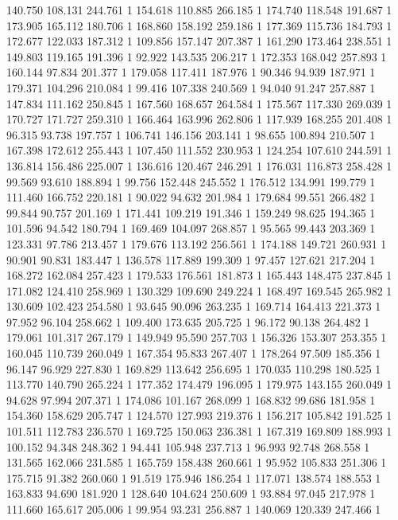 	140.750	108.131	244.761	1
	154.618	110.885	266.185	1
	174.740	118.548	191.687	1
	173.905	165.112	180.706	1
	168.860	158.192	259.186	1
	177.369	115.736	184.793	1
	172.677	122.033	187.312	1
	109.856	157.147	207.387	1
	161.290	173.464	238.551	1
	149.803	119.165	191.396	1
	92.922	143.535	206.217	1
	172.353	168.042	257.893	1
	160.144	97.834	201.377	1
	179.058	117.411	187.976	1
	90.346	94.939	187.971	1
	179.371	104.296	210.084	1
	99.416	107.338	240.569	1
	94.040	91.247	257.887	1
	147.834	111.162	250.845	1
	167.560	168.657	264.584	1
	175.567	117.330	269.039	1
	170.727	171.727	259.310	1
	166.464	163.996	262.806	1
	117.939	168.255	201.408	1
	96.315	93.738	197.757	1
	106.741	146.156	203.141	1
	98.655	100.894	210.507	1
	167.398	172.612	255.443	1
	107.450	111.552	230.953	1
	124.254	107.610	244.591	1
	136.814	156.486	225.007	1
	136.616	120.467	246.291	1
	176.031	116.873	258.428	1
	99.569	93.610	188.894	1
	99.756	152.448	245.552	1
	176.512	134.991	199.779	1
	111.460	166.752	220.181	1
	90.022	94.632	201.984	1
	179.684	99.551	266.482	1
	99.844	90.757	201.169	1
	171.441	109.219	191.346	1
	159.249	98.625	194.365	1
	101.596	94.542	180.794	1
	169.469	104.097	268.857	1
	95.565	99.443	203.369	1
	123.331	97.786	213.457	1
	179.676	113.192	256.561	1
	174.188	149.721	260.931	1
	90.901	90.831	183.447	1
	136.578	117.889	199.309	1
	97.457	127.621	217.204	1
	168.272	162.084	257.423	1
	179.533	176.561	181.873	1
	165.443	148.475	237.845	1
	171.082	124.410	258.969	1
	130.329	109.690	249.224	1
	168.497	169.545	265.982	1
	130.609	102.423	254.580	1
	93.645	90.096	263.235	1
	169.714	164.413	221.373	1
	97.952	96.104	258.662	1
	109.400	173.635	205.725	1
	96.172	90.138	264.482	1
	179.061	101.317	267.179	1
	149.949	95.590	257.703	1
	156.326	153.307	253.355	1
	160.045	110.739	260.049	1
	167.354	95.833	267.407	1
	178.264	97.509	185.356	1
	96.147	96.929	227.830	1
	169.829	113.642	256.695	1
	170.035	110.298	180.525	1
	113.770	140.790	265.224	1
	177.352	174.479	196.095	1
	179.975	143.155	260.049	1
	94.628	97.994	207.371	1
	174.086	101.167	268.099	1
	168.832	99.686	181.958	1
	154.360	158.629	205.747	1
	124.570	127.993	219.376	1
	156.217	105.842	191.525	1
	101.511	112.783	236.570	1
	169.725	150.063	236.381	1
	167.319	169.809	188.993	1
	100.152	94.348	248.362	1
	94.441	105.948	237.713	1
	96.993	92.748	268.558	1
	131.565	162.066	231.585	1
	165.759	158.438	260.661	1
	95.952	105.833	251.306	1
	175.715	91.382	260.060	1
	91.519	175.946	186.254	1
	117.071	138.574	188.553	1
	163.833	94.690	181.920	1
	128.640	104.624	250.609	1
	93.884	97.045	217.978	1
	111.660	165.617	205.006	1
	99.954	93.231	256.887	1
	140.069	120.339	247.466	1
